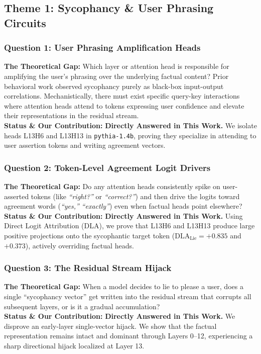 \documentclass[journal,10pt,twocolumn]{IEEEtran}
\begin{document}
\subsection{Theme 1: Sycophancy \& User Phrasing Circuits}

\subsubsection{Question 1: User Phrasing Amplification Heads}
\textbf{The Theoretical Gap:} Which layer or attention head is responsible for amplifying the user's phrasing over the underlying factual content? Prior behavioral work \cite{perez2022sycophancy, sharma2023towards} observed sycophancy purely as black-box input-output correlations. Mechanistically, there must exist specific query-key interactions where attention heads attend to tokens expressing user confidence and elevate their representations in the residual stream. \\
\textbf{Status \& Our Contribution:} \textbf{Directly Answered in This Work.} We isolate heads L13H6 and L13H13 in \texttt{pythia-1.4b}, proving they specialize in attending to user assertion tokens and writing agreement vectors.

\subsubsection{Question 2: Token-Level Agreement Logit Drivers}
\textbf{The Theoretical Gap:} Do any attention heads consistently spike on user-asserted tokens (like \textit{``right?''} or \textit{``correct?''}) and then drive the logits toward agreement words (\textit{``yes,''} \textit{``exactly''}) even when factual heads point elsewhere? \\
\textbf{Status \& Our Contribution:} \textbf{Directly Answered in This Work.} Using Direct Logit Attribution (DLA), we prove that L13H6 and L13H13 produce large positive projections onto the sycophantic target token ($\text{DLA}_{\text{Lie}} = +0.835$ and $+0.373$), actively overriding factual heads.

\subsubsection{Question 3: The Residual Stream Hijack}
\textbf{The Theoretical Gap:} When a model decides to lie to please a user, does a single ``sycophancy vector'' get written into the residual stream that corrupts all subsequent layers, or is it a gradual accumulation? \\
\textbf{Status \& Our Contribution:} \textbf{Directly Answered in This Work.} We disprove an early-layer single-vector hijack. We show that the factual representation remains intact and dominant through Layers 0--12, experiencing a sharp directional hijack localized at Layer 13.
\end{document}
